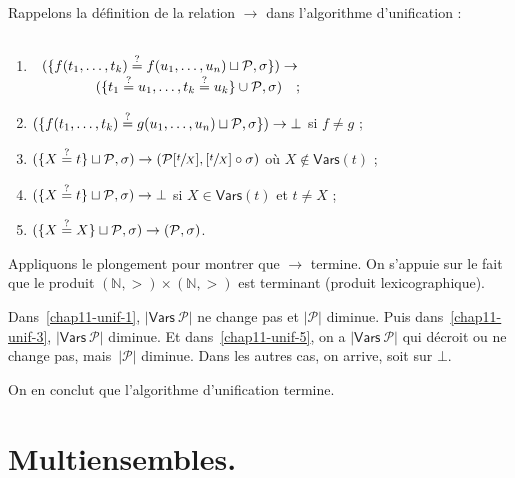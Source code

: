 \documentclass[../main]{subfiles}
\begin{document}
  Rappelons la définition de la relation $\to$ dans l'algorithme d'unification :
  \begin{enumerate}
    \item\label{chap11-unif-1} $ \begin{array}{c}
        \\
        (\{f(t_1,\mathinner{\ldotp\ldotp\ldotp},t_k) \mathrel{\overset ? =} f(u_1,\mathinner{\ldotp\ldotp\ldotp}, u_n) \sqcup \mathcal{P}, \sigma\}) \to\\
        \quad\quad\quad\quad(\{t_1 \mathrel{\overset ? =} u_1, \mathinner{\ldotp\ldotp\ldotp}, t_k \mathrel{\overset ? =} u_k\} \cup \mathcal{P}, \sigma) \quad ;
      \end{array} $
    \item \label{chap11-unif-2} $(\{f(t_1,\mathinner{\ldotp\ldotp\ldotp},t_k) \mathrel{\overset ? =} g(u_1,\mathinner{\ldotp\ldotp\ldotp}, u_n) \sqcup \mathcal{P}, \sigma\}) \to \bot$ si $f \neq g$ ;
    \item \label{chap11-unif-3} $(\{X\mathrel{\overset ? =} t\} \sqcup \mathcal{P}, \sigma) \to (\mathcal{P}[\sfrac{t}{X}], [\sfrac{t}{X}] \circ \sigma)$ où $X \not\in \mathsf{Vars}(t)$ ;
    \item \label{chap11-unif-4} $(\{X \mathrel{\overset ? =} t\}\sqcup \mathcal{P}, \sigma) \to \bot$ si $X \in \mathsf{Vars}(t)$ et $t \neq X$ ;
    \item \label{chap11-unif-5} $(\{X \mathrel{\overset ? =} X\}\sqcup \mathcal{P}, \sigma) \to (\mathcal{P}, \sigma)$.
  \end{enumerate}

  Appliquons le plongement pour montrer que $\to$ termine.
  On s'appuie sur le fait que le produit $(\mathds{N}, >) \times (\mathds{N}, >)$ est terminant (produit lexicographique).

  Dans~\ref{chap11-unif-1}, $|\mathsf{Vars}\ \mathcal{P}|$ ne change pas et $|\mathcal{P}|$ diminue.
  Puis dans~\ref{chap11-unif-3}, $|\mathsf{Vars}\ \mathcal{P}|$ diminue.
  Et dans~\ref{chap11-unif-5}, on a $|\mathsf{Vars}\ \mathcal{P}|$ qui décroit ou ne change pas, mais~$|\mathcal{P}|$ diminue.
  Dans les autres cas, on arrive, soit sur $\bot$.

  On en conclut que l'algorithme d'unification termine.


  \section{Multiensembles.}
\end{document}
